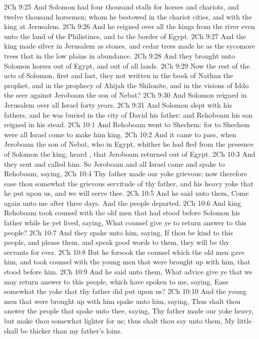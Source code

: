 \vs 2Ch 9:25 And Solomon had four thousand stalls for horses and chariots, and twelve thousand horsemen; whom he bestowed in the chariot cities, and with the king at Jerusalem.
\vs 2Ch 9:26 And he reigned over all the kings from the river even unto the land of the Philistines, and to the border of Egypt.
\vs 2Ch 9:27 And the king made silver in Jerusalem as stones, and cedar trees made he as the sycomore trees that  in the low plains in abundance.
\vs 2Ch 9:28 And they brought unto Solomon horses out of Egypt, and out of all lands.
\vs 2Ch 9:29 Now the rest of the acts of Solomon, first and last,  they not written in the book of Nathan the prophet, and in the prophecy of Ahijah the Shilonite, and in the visions of Iddo the seer against Jeroboam the son of Nebat?
\vs 2Ch 9:30 And Solomon reigned in Jerusalem over all Israel forty years.
\vs 2Ch 9:31 And Solomon slept with his fathers, and he was buried in the city of David his father: and Rehoboam his son reigned in his stead.
\vs 2Ch 10:1 And Rehoboam went to Shechem: for to Shechem were all Israel come to make him king.
\vs 2Ch 10:2 And it came to pass, when Jeroboam the son of Nebat, who  in Egypt, whither he had fled from the presence of Solomon the king, heard , that Jeroboam returned out of Egypt.
\vs 2Ch 10:3 And they sent and called him. So Jeroboam and all Israel came and spake to Rehoboam, saying,
\vs 2Ch 10:4 Thy father made our yoke grievous: now therefore ease thou somewhat the grievous servitude of thy father, and his heavy yoke that he put upon us, and we will serve thee.
\vs 2Ch 10:5 And he said unto them, Come again unto me after three days. And the people departed.
\vs 2Ch 10:6 And king Rehoboam took counsel with the old men that had stood before Solomon his father while he yet lived, saying, What counsel give ye  to return answer to this people?
\vs 2Ch 10:7 And they spake unto him, saying, If thou be kind to this people, and please them, and speak good words to them, they will be thy servants for ever.
\vs 2Ch 10:8 But he forsook the counsel which the old men gave him, and took counsel with the young men that were brought up with him, that stood before him.
\vs 2Ch 10:9 And he said unto them, What advice give ye that we may return answer to this people, which have spoken to me, saying, Ease somewhat the yoke that thy father did put upon us?
\vs 2Ch 10:10 And the young men that were brought up with him spake unto him, saying, Thus shalt thou answer the people that spake unto thee, saying, Thy father made our yoke heavy, but make thou  somewhat lighter for us; thus shalt thou say unto them, My little  shall be thicker than my father's loins.
